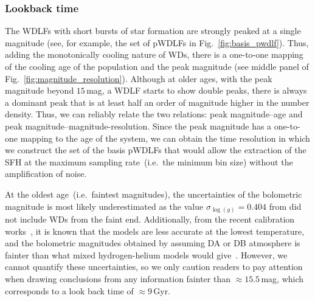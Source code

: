 \documentclass[fleqn,usenatbib]{mnras}
\begin{document}
\subsubsection{Lookback time}
The WDLFs with short bursts of star formation are strongly peaked at a single
magnitude (see, for example, the set of pWDLFs in Fig.~\ref{fig:basis_pwdlf}).
Thus, adding the monotonically cooling nature of WDs, there is a one-to-one
mapping of the cooling age of the population and the peak magnitude (see middle
panel of Fig.~\ref{fig:magnitude_resolution}). Although at older ages, with the
peak magnitude beyond $15$\,mag, a WDLF starts to show double peaks, there is
always a dominant peak that is at least half an order of magnitude higher in
the number density. Thus, we can reliably relate the two relations: peak
magnitude--age and peak magnitude--magnitude-resolution. Since the peak
magnitude has a one-to-one mapping to the age of the system, we can obtain the
time resolution in which we construct the set of the basis pWDLFs that would
allow the extraction of the SFH at the maximum sampling rate~(i.e.\ the minimum
bin size) without the amplification of noise.

At the oldest age~(i.e.\ faintest magnitudes), the uncertainties of the
bolometric magnitude is most likely underestimated as the value
$\sigma_{\log(g)} = 0.404$ from \citet{2014ApJ...796..128G} did not
include WDs from the faint end. Additionally, from the recent calibration
works~\citep{2022ApJ...934...36B}, it is known that the models are less
accurate at the lowest  temperature, and the bolometric magnitudes obtained by
assuming DA or DB atmosphere is fainter than what mixed hydrogen-helium models
would give~\citep{2022ApJ...934...36B}. However, we cannot quantify these
uncertainties, so we only caution readers to pay attention when drawing conclusions
from any information fainter than $\approx15.5$\,mag, which corresponds to a
look back time of $\approx9$\,Gyr.
\end{document}
